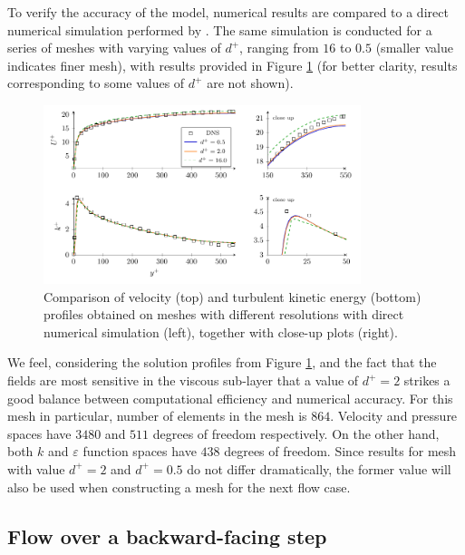 To verify the accuracy of the model, numerical results are compared to a direct numerical simulation performed by \cite{lee_direct_2015}. The same simulation is conducted for a series of meshes with varying values of \(d^+\), ranging from \(16\) to \(0.5\) (smaller value indicates finer mesh), with results provided in Figure \ref{fig: channel flow profiles} (for better clarity, results corresponding to some values of \(d^+\) are not shown). 

\begin{figure}[htbp]
    \centering
    \includegraphics[width=0.825\textwidth]{channel flow-profiles.pdf}
    \captionsetup{width=0.85\textwidth}
    \caption{Comparison of velocity (top) and turbulent kinetic energy (bottom) profiles obtained on meshes with different resolutions with direct numerical simulation (left), together with close-up plots (right).}
    \label{fig: channel flow profiles}
\end{figure}

We feel, considering the solution profiles from Figure \ref{fig: channel flow profiles}, and the fact that the fields are most sensitive in the viscous sub-layer that a value of \(d^+ = 2\) strikes a good balance between computational efficiency and numerical accuracy. For this mesh in particular, number of elements in the mesh is \(864\). Velocity and pressure spaces have \(3480\) and \(511\) degrees of freedom respectively. On the other hand, both \(k\) and \(\varepsilon\) function spaces have \(438\) degrees of freedom. Since results for mesh with value \(d^+ = 2\) and \(d^+ = 0.5\) do not differ dramatically, the former value will also be used when constructing a mesh for the next flow case.  

\subsection{Flow over a backward-facing step}

